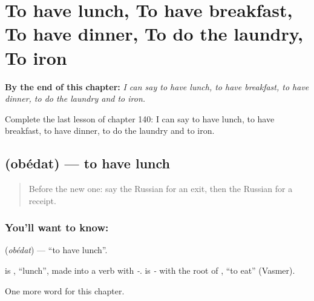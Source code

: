 
\chapter{To have lunch, To have breakfast, To have dinner, To do the laundry, To iron}
\label{ch:ru-to-have-lunch-to-have-breakfast-to-have-dinner-to-do-the-laundry-to-iron}

\begin{chapteropening}
\textbf{By the end of this chapter:} \emph{I can say to have lunch, to have breakfast, to have dinner, to do the laundry and to iron.}

Complete the last lesson of chapter 140: I can say to have lunch, to have breakfast, to have dinner, to do the laundry and to iron.
\end{chapteropening}

\section[\texorpdfstring{\ru{обедать} (obédat)}{обедать (obédat)}]{ (obédat) — to have lunch}

\label{lesson:RU-C140-obedat}



\begin{quote}
Before the new one: say the Russian for an exit, then the Russian for a receipt.
\end{quote}

\subsection*{You'll want to know: }
\textbf{} (\emph{obédat}) — \textquotedblleft{}to have lunch\textquotedblright{}.

\begin{cousinweb}
\textbf{} is \emph{}, \textquotedblleft{}lunch\textquotedblright{}, made into a verb with \emph{-}. \emph{} is \emph{-} with the root of \emph{}, \textquotedblleft{}to eat\textquotedblright{} (Vasmer).
\end{cousinweb}

\begin{grammarlens}[title={What you've built}]
One more word for this chapter.
\end{grammarlens}

